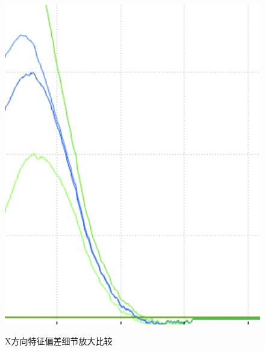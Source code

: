 \documentclass[fontset=fandol,type=bachelor,campus=harbin,bsmainpagenumberline=true]{hithesisbook}
\begin{document}
\begin{figure}[h]
{\begin{minipage}[h]{0.28\textwidth}
			\includegraphics[width=1\textwidth]{chapter5/error_x0（处理后）}
		\end{minipage}
		\label{X方向特征偏差（处理后）}
	}
	\caption{X方向特征偏差细节放大比较}
	\label{X方向特征偏差细节放大比较}
\end{figure}
\end{document}
